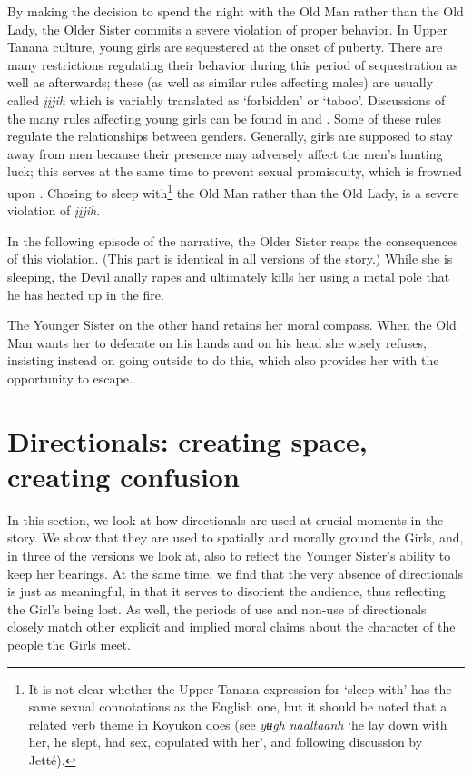 By making the decision to spend the night with the Old Man rather than the Old Lady, the Older Sister commits a severe violation of proper behavior. In Upper Tanana culture, young girls are sequestered at the onset of puberty. There are many restrictions regulating their behavior during this period of sequestration as well as afterwards; these (as well as similar rules affecting males) are usually called {\em įįjih} which is variably translated as `forbidden' or `taboo'. Discussions of the many rules affecting young girls can be found in \citet{TyoneM1996} and \citet{DavidCforthc}. Some of these rules regulate the relationships between genders. Generally, girls are supposed to stay away from men because their presence may adversely affect the men's hunting luck; this serves at the same time to prevent sexual promiscuity, which is frowned upon \citep[174, 187, 190]{GuedonM1974}. Chosing to sleep with\footnote{It is not clear whether the Upper Tanana expression for `sleep with' has the same sexual connotations as the English one, but it should be noted that a related verb theme in Koyukon does (see \citealp[496]{JetteJJonesE2000} {\em yʉgh naaltaanh} `he lay down with her, he slept, had sex, copulated with her', and following discussion by Jetté).}  the Old Man rather than the Old Lady, is a severe violation of {\em įįjih}.

In the following episode of the narrative, the Older Sister reaps the consequences of this violation. (This part is identical in all versions of the story.) While she is sleeping, the Devil anally rapes and ultimately kills her using a metal pole that he has heated up in the fire.

The Younger Sister on the other hand retains her moral compass. When the Old Man wants her to defecate on his hands and on his head she wisely refuses, insisting instead on going outside to do this, which also provides her with the opportunity to escape.

\section{Directionals: creating space, creating confusion}
\label{brucks:section:directionals-space-creation}

In this section, we look at how directionals are used at crucial moments in the story. We show that they are used to spatially and morally ground the Girls, and, in three of the versions we look at, also to reflect the Younger Sister's ability to keep her bearings. At the same time, we find that the very absence of directionals is just as meaningful, in that it serves to disorient the audience, thus reflecting the Girl's being lost. As well, the periods of use and non-use of directionals closely match other explicit and implied moral claims about the character of the people the Girls meet.


